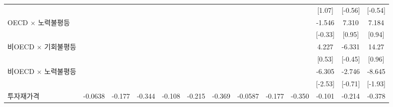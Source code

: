 \begin{table}[htbp]
{\begin{tabular}{l*{12}{c}}
                    &                     &                     &                     &                     &                     &                     &                     &                     &                     &      [1.07]         &     [-0.56]         &     [-0.54]         \\
\addlinespace
OECD $\times$ 노력불평등&                     &                     &                     &                     &                     &                     &                     &                     &                     &      -1.546         &       7.310         &       7.184         \\
                    &                     &                     &                     &                     &                     &                     &                     &                     &                     &     [-0.33]         &      [0.95]         &      [0.94]         \\
\addlinespace
비OECD $\times$ 기회불평등&                     &                     &                     &                     &                     &                     &                     &                     &                     &       4.227         &      -6.331         &       14.27         \\
                    &                     &                     &                     &                     &                     &                     &                     &                     &                     &      [0.53]         &     [-0.45]         &      [0.96]         \\
\addlinespace
비OECD $\times$ 노력불평등&                     &                     &                     &                     &                     &                     &                     &                     &                     &      -6.305\sym{**} &      -2.746         &      -8.645\sym{*}  \\
                    &                     &                     &                     &                     &                     &                     &                     &                     &                     &     [-2.53]         &     [-0.71]         &     [-1.93]         \\
\addlinespace
투자재가격        &     -0.0638         &      -0.177         &      -0.344         &      -0.108         &      -0.215         &      -0.369         &     -0.0587         &      -0.177         &      -0.350         &      -0.101         &      -0.214         &      -0.378\sym{*}  \\

\end{tabular}}
\end{table}
